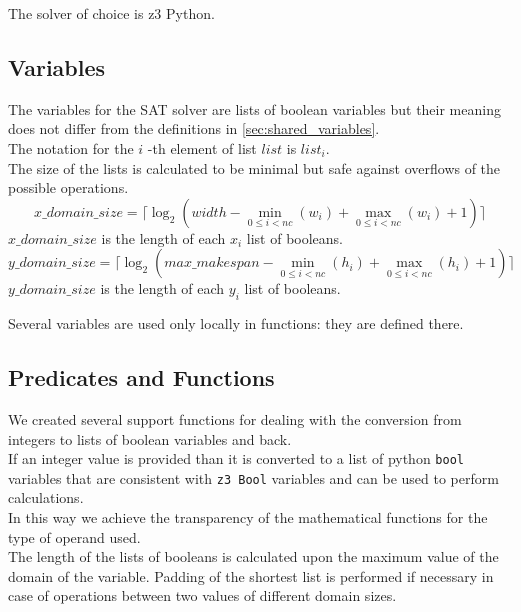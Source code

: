     The solver of choice is z3 Python.


\subsection{Variables}\label{subsec:SAT_variables}
  The variables for the SAT solver are lists of boolean variables but their meaning does not differ from the 
  definitions in \ref{sec:shared_variables}.\\

  The notation for the \(i\) -th element of list 
  \(list\)  is \(list_i\).\\

  The size of the lists is calculated to be minimal but safe against overflows of the possible operations.
  \begin{equation*}
    x\_domain\_size = \lceil \log_2 (width - \min_{0 \leq i < nc} (w_i) + \max_{0 \leq i < nc}(w_i) + 1) \rceil
  \end{equation*}
  \( x\_domain\_size \) is the length of each \(x_i\) list of booleans.
  \begin{equation*}
    y\_domain\_size = \lceil \log_2 (max\_makespan - \min_{0 \leq i < nc} (h_i) + \max_{0 \leq i < nc}(h_i) + 1) \rceil
  \end{equation*}
  \(y\_domain\_size\) is the length of each \(y_i\) list of booleans.

  Several variables are used only locally in functions: they are defined there.\\


\subsection{Predicates and Functions}\label{subsec:SAT_predicates}
  We created several support functions for dealing with the conversion from integers to lists of
  boolean variables and back.\\
  If an integer value is provided than it is converted to a list of python \texttt{bool} variables
  that are consistent with 
  \texttt{z3 Bool} variables and can be used to perform calculations.\\
  In this way we achieve the transparency of the mathematical functions for the type of operand 
  used.\\
  The length of the lists of booleans is calculated upon the maximum value of the domain of the
  variable. Padding of the shortest list is performed if necessary in case of operations between
  two values of different domain sizes. \\

